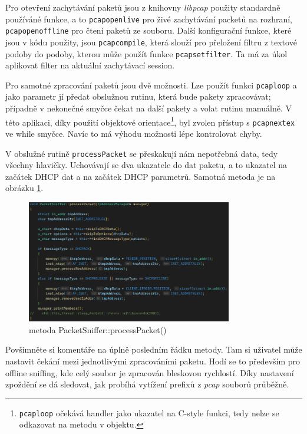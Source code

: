 \documentclass[a4paper, 11pt, hidelinks]{article}
\begin{document}
Pro otevření zachytávání paketů jsou z knihovny \emph{libpcap} použity standardně používáné funkce, a to \texttt{pcap\textunderscore open\textunderscore live} pro živé zachytávání packetů na rozhraní, \texttt{pcap\textunderscore open\textunderscore offline} pro čtení paketů ze souboru.
Další konfigurační funkce, které jsou v kódu použity, jsou \texttt{pcap\textunderscore compile}, která slouží pro přeložení filtru z textové podoby do podoby, kterou může použít funkce \texttt{pcap\textunderscore setfilter}.
Ta má za úkol aplikovat filter na aktuální zachytávací session.

Pro samotné zpracování paketů jsou dvě možnosti.
Lze použít funkci \texttt{pcap\textunderscore loop} a jako parametr jí předat obslužnou rutinu, která bude pakety zpracovávat; případně v nekonečné smyčce čekat na další pakety a volat rutinu manuálně.
V této aplikaci, díky použití objektové orientace\footnote[6]{\texttt{pcap\textunderscore loop} očekává handler jako ukazatel na C-style funkci, tedy nelze se odkazovat na metodu v objektu.}, byl zvolen přístup s \texttt{pcap\textunderscore next\textunderscore ex} ve while smyčce.
Navíc to má výhodu možnosti lépe kontrolovat chyby.

V obslužné rutině \texttt{processPacket} se přeskakují nám nepotřebná data, tedy všechny hlavičky. Uchovávají se dva ukazatele do dat paketu, a to ukazatel na začátek DHCP dat a na začátek DHCP parametrů.
Samotná metoda je na obrázku \ref{pic:processPacket}.
\begin{figure}[t]
    \centering
    \includegraphics[width=0.8\textwidth]{img/processPacket.png}
    \caption{metoda PacketSniffer::processPacket()}
    \label{pic:processPacket}
\end{figure} 

Povšimněte si komentáře na úplně posledním řádku metody. 
Tam si uživatel může nastavit čekání mezi jednotlivými zpracováními paketu.
Hodí se to především pro offline sniffing, kde celý soubor je zpracován bleskovou rychlostí.
Díky nastavení zpoždění se dá sledovat, jak probíhá vytížení prefixů z \emph{pcap} souborů průběžně.
\end{document}
